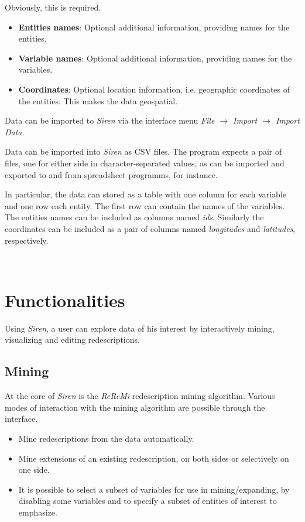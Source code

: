 \documentclass[letterpaper,10pt,english]{sphinxhowto}
\begin{document}
Obviously, this is required.
\begin{itemize}
\item {} 
\textbf{Entities names}: Optional additional information, providing names for the entities.

\item {} 
\textbf{Variable names}: Optional additional information, providing names for the variables.

\item {} 
\textbf{Coordinates}: Optional location information, i.e. geographic coordinates of the entities. This makes the data geospatial.

\end{itemize}

Data can be imported to \emph{Siren} via the interface menu \emph{File \(\rightarrow\) Import \(\rightarrow\) Import Data}.

Data can be imported into \emph{Siren} as CSV files. The program expects a pair of files, one for either side in character-separated values, as can be imported and exported to and from spreadsheet programms, for instance.

In particular, the data can stored as a table with one column for each variable and one row each entity.
The first row can contain the names of the variables.
The entities names can be included as columns named \emph{ids}. Similarly the coordinates can be included as a pair of columns named \emph{longitudes} and \emph{latitudes}, respectively.


\vfill
~
\newpage
~
\vfill

\section{Functionalities}
\label{functionalities::doc}\label{functionalities:functionalities}\label{functionalities:funct}
Using \emph{Siren}, a user can explore data of his interest by interactively mining, visualizing and editing redescriptions.


\subsection{Mining}
\label{functionalities:mining}\label{functionalities:func-mine}
At the core of \emph{Siren} is the \emph{ReReMi} redescription
mining algorithm. Various modes of interaction with the mining
algorithm are possible through the interface.
\begin{itemize}
\item {} 
Mine redescriptions from the data automatically.

\item {} 
Mine extensions of an existing redescription, on both sides or selectively on one side.

\item {} 
It is possible to select a subset of variables for use in mining/expanding, by disabling some variables and to specify a subset of entities of interest to emphasize.

\end{itemize}
\end{document}
